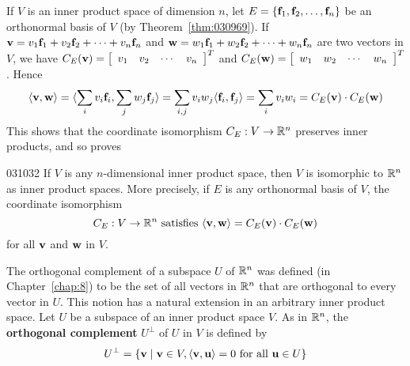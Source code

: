 If $V$ is an inner product space of dimension $n$, let $E = \{\textbf{f}_{1}, \textbf{f}_{2}, \dots, \textbf{f}_{n}\}$ be an orthonormal basis of $V$ (by Theorem~\ref{thm:030969}). If $\textbf{v} = v_{1}\textbf{f}_{1} + v_{2}\textbf{f}_{2} + \dots + v_{n}\textbf{f}_{n}$ and $\textbf{w} = w_1\textbf{f}_1 + w_2\textbf{f}_2 + \dots + w_n\textbf{f}_n$ are two vectors in $V$, we have $C_E(\textbf{v}) = 
\left[ \begin{array}{cccc}
v_1 & v_2 & \cdots & v_n
\end{array} \right] ^T$ and $C_E(\textbf{w}) = 
\left[ \begin{array}{cccc}
w_1 & w_2 & \cdots & w_n
\end{array} \right] ^T$. Hence
\begin{equation*}
\langle \textbf{v}, \textbf{w} \rangle = 
\langle \sum_{i}v_i\textbf{f}_i, \sum_{j}w_j\textbf{f}_j \rangle = \sum_{i, j}v_iw_j \langle \textbf{f}_i, \textbf{f}_j \rangle =
\sum_{i} v_iw_i = C_E(\textbf{v}) \cdot C_E(\textbf{w})
\end{equation*}
This shows that the coordinate isomorphism $C_E : V \to \mathbb{R}^n$ preserves inner products, and so proves

\begin{corollary}{}{031032}
If $V$ is any $n$-dimensional inner product space, then $V$ is isomorphic to $\mathbb{R}^{n}$ as inner product spaces. More precisely, if $E$ is any orthonormal basis of $V$, the coordinate isomorphism
\begin{equation*}
C_E : V \to \mathbb{R}^n \mbox{ satisfies } \langle \textbf{v}, \textbf{w} \rangle = C_E(\textbf{v}) \cdot C_E(\textbf{w})
\end{equation*}
for all $\textbf{v}$ and $\textbf{w}$ in $V$.
\end{corollary}

The orthogonal complement of a subspace $U$ of $\mathbb{R}^n$ was defined (in Chapter~\ref{chap:8}) to be the set of all vectors in $\mathbb{R}^n$ that are orthogonal to every vector in $U$. This notion has a natural extension in an arbitrary inner product space. Let $U$ be a subspace of an inner product space $V$. As in $\mathbb{R}^n$, the \textbf{orthogonal complement} $U^{\perp}$ of $U$ in $V$ is defined by
\begin{equation*}
U^\perp = \{\textbf{v} \mid \textbf{v} \in V, \langle \textbf{v}, \textbf{u} \rangle = 0 \mbox{ for all } \textbf{u} \in U \}
\end{equation*}

